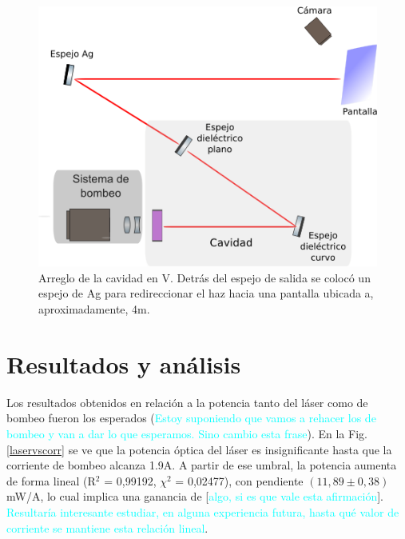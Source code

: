 \documentclass[10pt, a4paper]{article}%
\begin{document}
\begin{multicols}{2}
\begin{figure}[H]
    \centering
    \includegraphics[scale=0.5]{Graficos/cavV1.png}
    \caption{Arreglo de la cavidad en V. Detrás del espejo de salida se colocó un espejo de Ag para redireccionar el haz hacia una pantalla ubicada a, aproximadamente, 4m.}
    \label{cavV1}
\end{figure}


\section{Resultados y análisis}

Los resultados obtenidos en relación a la potencia tanto del láser como de bombeo fueron los esperados (\textcolor{cyan}{Estoy suponiendo que vamos a rehacer los de bombeo y van a dar lo que esperamos. Sino cambio esta frase}). En la Fig. \ref{laservscorr} se ve que la potencia óptica del láser es insignificante hasta que la corriente de bombeo alcanza 1.9A. A partir de ese umbral, la potencia aumenta de forma lineal  (R$^2$ = 0,99192, $\chi^2$ = 0,02477), con pendiente $ (11,89 \pm 0,38)$mW/A, lo cual implica una ganancia de [\textcolor{cyan}{algo, si es que vale esta afirmación}]. \textcolor{cyan}{Resultaría interesante estudiar, en alguna experiencia futura, hasta qué valor de corriente se mantiene esta relación lineal}. 


\end{multicols}
\end{document}
